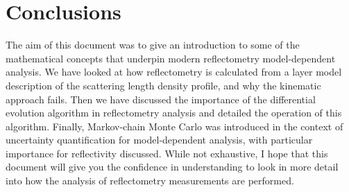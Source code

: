 \documentclass[
 reprint,
 superscriptaddress,
 amsmath,amssymb,
 aps,
]{revtex4-2}
\begin{document}
\section{Conclusions}
The aim of this document was to give an introduction to some of the mathematical concepts that underpin modern reflectometry model-dependent analysis. 
We have looked at how reflectometry is calculated from a layer model description of the scattering length density profile, and why the kinematic approach fails. 
Then we have discussed the importance of the differential evolution algorithm in reflectometry analysis and detailed the operation of this algorithm. 
Finally, Markov-chain Monte Carlo was introduced in the context of uncertainty quantification for model-dependent analysis, with particular importance for reflectivity discussed. 
While not exhaustive, I hope that this document will give you the confidence in understanding to look in more detail into how the analysis of reflectometry measurements are performed.



\end{document}
